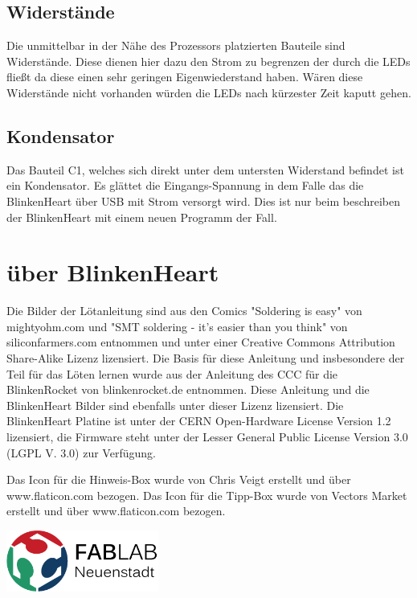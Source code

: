 \documentclass{article} %
\begin{document}
\subsection{Widerstände}
Die unmittelbar in der Nähe des Prozessors platzierten Bauteile sind Widerstände. Diese dienen hier dazu den Strom zu begrenzen der durch die LEDs fließt da diese einen sehr geringen Eigenwiederstand haben. Wären diese Widerstände nicht vorhanden würden die LEDs nach kürzester Zeit kaputt gehen.

\newpage
\subsection{Kondensator}
Das Bauteil C1, welches sich direkt unter dem untersten Widerstand befindet ist ein Kondensator. Es glättet die Eingangs-Spannung in dem Falle das die BlinkenHeart über USB mit Strom versorgt wird. Dies ist nur beim beschreiben der BlinkenHeart mit einem neuen Programm der Fall.

\newpage
\section{über BlinkenHeart}
{\footnotesize Die Bilder der Lötanleitung sind aus den Comics "Soldering is easy" von mightyohm.com und
"SMT soldering - it's easier than you think" von siliconfarmers.com entnommen und unter einer
Creative Commons Attribution Share-Alike Lizenz lizensiert.
Die Basis für diese Anleitung
und insbesondere der Teil für das Löten lernen wurde aus der Anleitung des CCC für die BlinkenRocket
von blinkenrocket.de entnommen.
Diese Anleitung und die BlinkenHeart Bilder sind ebenfalls unter dieser Lizenz lizensiert.
Die BlinkenHeart Platine ist unter der CERN Open-Hardware License Version 1.2 lizensiert, die Firmware steht unter der Lesser General
Public License Version 3.0 (LGPL V. 3.0) zur Verfügung.

Das Icon für die Hinweis-Box wurde von Chris Veigt erstellt und über www.flaticon.com bezogen.
Das Icon für die Tipp-Box wurde von Vectors Market erstellt und über www.flaticon.com bezogen.}

\begin{center}
	\includegraphics[width=5cm]{logo}
\end{center}
\end{document}
